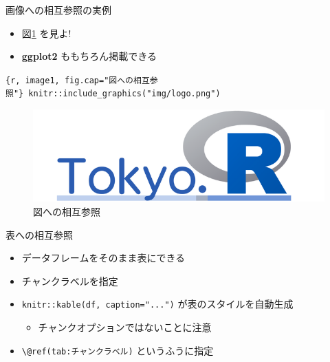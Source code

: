 \documentclass[
  ignorenonframetext,
]{beamer}
\providecommand{\tightlist}{%
  \setlength{\itemsep}{0pt}\setlength{\parskip}{0pt}}
\begin{document}
\begin{frame}[fragile]{画像への相互参照の実例}
\protect\hypertarget{ux753bux50cfux3078ux306eux76f8ux4e92ux53c2ux7167ux306eux5b9fux4f8b}{}
\begin{itemize}
\tightlist
\item
  図\ref{fig:image1} を見よ!
\item
  \textbf{ggplot2} ももちろん掲載できる
\end{itemize}

\texttt{\{r,\ image1,\ fig.cap="図への相互参照"\}\ knitr::include\_graphics("img/logo.png")}

\begin{figure}

{\centering \includegraphics[width=1\linewidth,height=0.3\textheight,keepaspectratio]{img/logo} 

}

\caption{図への相互参照}\label{fig:image1}
\end{figure}
\end{frame}

\begin{frame}[fragile]{表への相互参照}
\protect\hypertarget{ux8868ux3078ux306eux76f8ux4e92ux53c2ux7167}{}
\begin{itemize}
\item
  データフレームをそのまま表にできる
\item
  チャンクラベルを指定
\item
  \texttt{knitr::kable(df,\ caption="...")} が表のスタイルを自動生成

  \begin{itemize}
  \tightlist
  \item
    チャンクオプションではないことに注意
  \end{itemize}
\item
  \texttt{\textbackslash{}@ref(tab:チャンクラベル)} というふうに指定
\end{itemize}
\end{frame}
\end{document}
